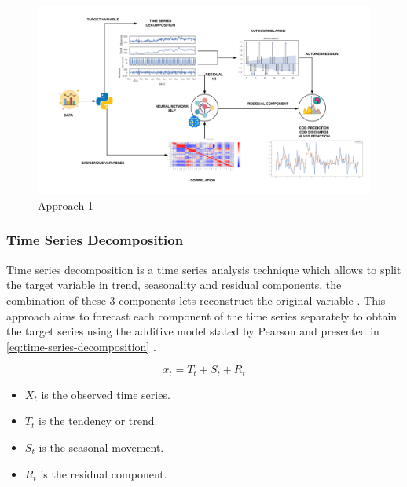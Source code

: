 \begin{figure}[h]
\centering
\includegraphics[width=\linewidth]{figures/Ch4/Approach1.png}
\caption{Approach 1}
\label{f:Approach 1}
\end{figure}

\subsubsection{Time Series Decomposition}
\label{ss:time-series-decomposition}

Time series decomposition is a time series analysis technique which allows to split the target variable in trend, seasonality and residual components, the combination of these 3 components lets reconstruct the original variable \cite{Cryer2008}. This approach aims to forecast each component of the time series separately to obtain the target series using the additive model stated by Pearson and presented in \autoref{eq:time-series-decomposition}
\cite{dagum2010time}.

\begin{equation}\label{eq:time-series-decomposition}
    x_t = T_t + S_t + R_t
\end{equation}

\begin{itemize}
    \item \begin{math}X_t\end{math} is the observed time series.
    \item \begin{math}T_t\end{math} is the tendency or trend.
    \item \begin{math}S_t\end{math} is the seasonal movement.
    \item \begin{math}R_t\end{math} is the residual component.
\end{itemize}

